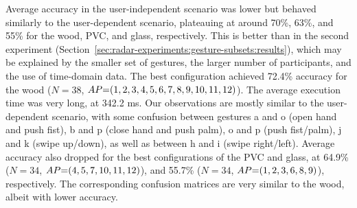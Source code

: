 Average accuracy in the user-independent scenario was lower but behaved similarly to the user-dependent scenario, plateauing at around 70\%, 63\%, and 55\% for the wood, PVC, and glass, respectively. This is better than in the second experiment (Section~\ref{sec:radar-experiments:gesture-subsets:results}), which may be explained by the smaller set of gestures, the larger number of participants, and the use of time-domain data.
The best configuration achieved 72.4\% accuracy for the wood ($N{=}38$, $\splitatcommas{AP{=}(1, 2, 3, 4, 5, 6, 7, 8, 9, 10, 11, 12)}$). The average execution time was very long, at 342.2 ms.
%
Our observations are mostly similar to the user-dependent scenario, with some confusion between gestures a and o (open hand and push fist), b and p (close hand and push palm), o and p (push fist/palm), j and k (swipe up/down),  as well as between h and i (swipe right/left).
Average accuracy also dropped for the best configurations of the PVC and glass, at 64.9\% ($N{=}34$, $\splitatcommas{AP{=}(4, 5, 7, 10, 11, 12)}$), and 55.7\% ($N{=}34$, $\splitatcommas{AP{=}(1, 2, 3, 6, 8, 9)}$), respectively. The corresponding confusion matrices are very similar to the wood, albeit with lower accuracy.

